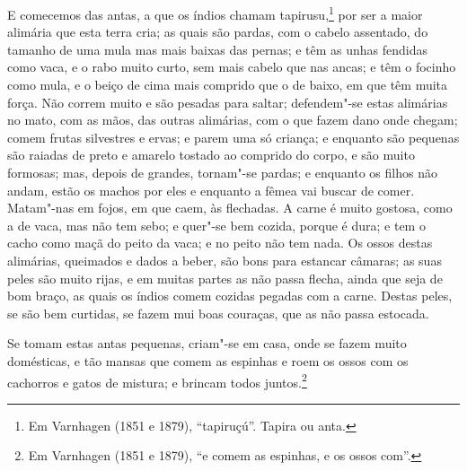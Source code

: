 \begin{linenumbers}
E comecemos das antas, a que os índios chamam tapirusu,\footnote{ Em Varnhagen (1851 e
1879), ``tapiruçú''. Tapira ou anta.} por ser a maior alimária que esta terra cria; as
quais são pardas, com o cabelo assentado, do tamanho de uma mula mas mais baixas das
pernas; e têm as unhas fendidas como vaca, e o rabo muito curto, sem mais cabelo que nas
ancas; e têm o focinho como mula, e o beiço de cima mais comprido que o de baixo, em que
têm muita força. Não correm muito e são pesadas para saltar; defendem"-se estas alimárias
no mato, com as mãos, das outras alimárias, com o que fazem dano onde chegam; comem frutas
silvestres e ervas; e parem uma só criança; e enquanto são pequenas são raiadas de preto e
amarelo tostado ao comprido do corpo, e são muito formosas; mas, depois de grandes,
tornam"-se pardas; e enquanto os filhos não andam, estão os machos por eles e enquanto a
fêmea vai buscar de comer. Matam"-nas em fojos, em que caem, às flechadas. A carne é muito
gostosa, como a de vaca, mas não tem sebo; e quer"-se bem cozida, porque é dura; e tem o
cacho como maçã do peito da vaca; e no peito não tem nada. Os ossos destas alimárias,
queimados e dados a beber, são bons para estancar câmaras; as suas peles são muito rijas,
e em muitas partes as não passa flecha, ainda que seja de bom braço, as quais os índios
comem cozidas pegadas com a carne. Destas peles, se são bem curtidas, se fazem mui boas
couraças, que as não passa estocada.

Se tomam estas antas pequenas, criam"-se em casa, onde se fazem muito domésticas, e tão
mansas que comem as espinhas e roem os ossos com os cachorros e gatos de mistura; e
brincam todos juntos.\footnote{ Em Varnhagen (1851 e 1879), ``e comem as espinhas, e os
ossos com''.}


\end{linenumbers}
